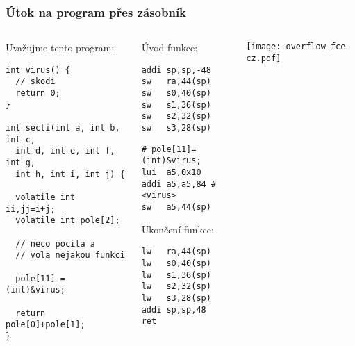 \documentclass{beamer}
\begin{document}
\begin{frame}[fragile,shrink=5]
\frametitle{Útok na program přes zásobník}

\begin{columns}
\begin{column}{0.42\textwidth}
Uvažujme tento program:

\begin{verbatim}
int virus() {
  // skodi
  return 0;
}

int secti(int a, int b, int c, 
  int d, int e, int f, int g, 
  int h, int i, int j) {
  
  volatile int ii,jj=i+j;
  volatile int pole[2];
  
  // neco pocita a
  // vola nejakou funkci
  
  pole[11] = (int)&virus;
  
  return pole[0]+pole[1];
}
\end{verbatim}
\end{column}   
\begin{column}{0.25\textwidth}
Úvod funkce:

\begin{verbatim}
addi sp,sp,-48
sw   ra,44(sp)
sw   s0,40(sp)
sw   s1,36(sp)
sw   s2,32(sp)
sw   s3,28(sp)
\end{verbatim}


\begin{verbatim}
# pole[11]=(int)&virus;
lui  a5,0x10
addi a5,a5,84 # <virus>
sw   a5,44(sp)
\end{verbatim}

Ukončení funkce:

\begin{verbatim}
lw   ra,44(sp)
lw   s0,40(sp)
lw   s1,36(sp)
lw   s2,32(sp)
lw   s3,28(sp)
addi sp,sp,48
ret
\end{verbatim}
\end{column}
\begin{column}{0.33\textwidth}  
\texttt{[image: overflow\_fce-cz.pdf]}
\end{column}
\end{columns}
\end{frame}
\end{document}
